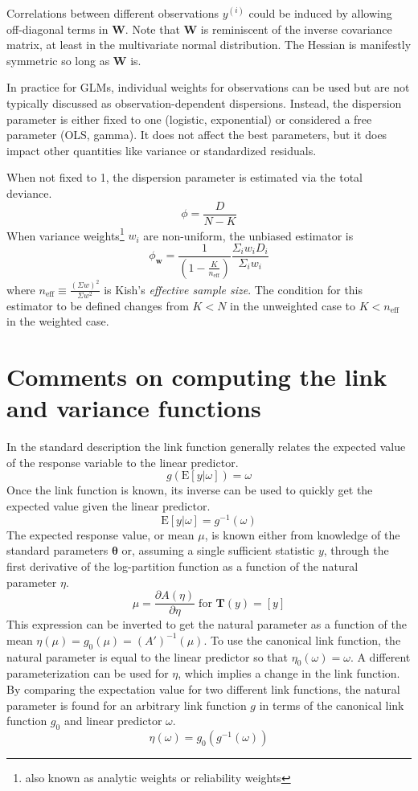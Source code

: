 \documentclass{article}
\begin{document}
Correlations between different observations \(y^{(i)}\) could be induced by
allowing off-diagonal terms in \(\mathbf{W}\). Note that \(\mathbf{W}\) is
reminiscent of the inverse covariance matrix, at least in the multivariate
normal distribution. The Hessian is manifestly symmetric so long as
\(\mathbf{W}\) is.

In practice for GLMs, individual weights for observations can be used but are
not typically discussed as observation-dependent dispersions. Instead, the
dispersion parameter is either fixed to one (logistic, exponential) or
considered a free parameter (OLS, gamma). It does not affect the best
parameters, but it does impact other quantities like variance or standardized
residuals.

When not fixed to 1, the dispersion parameter is estimated via the total deviance.
\[\phi = \frac{D}{N - K} \]
When variance weights\footnote{also known as analytic weights or reliability
weights} $w_i$ are non-uniform, the unbiased estimator is
\[\phi_{\mathbf{w}} = \frac{1}{\left(1 - \frac{K}{n_\mathrm{eff}}\right)} \frac{\Sigma_i w_i D_i}{\Sigma_i w_i} \]
where \(n_\mathrm{eff} \equiv \frac{\left(\Sigma w\right)^2}{\Sigma w^2} \) is Kish's
\emph{effective sample size}. The condition for this estimator to be defined
changes from \(K < N\) in the unweighted case to \(K < n_\mathrm{eff}\) in the
weighted case.

\section{Comments on computing the link and variance functions}

In the standard description the link function generally relates the expected
value of the response variable to the linear predictor.
\[ g(\textrm{E}[y|\omega]) = \omega \]
Once the link function is known, its inverse can be used to quickly get the
expected value given the linear predictor.
\[ \textrm{E}[y|\omega] = g^{-1}(\omega) \]
The expected response value, or mean \(\mu\), is known either from knowledge
of the standard parameters \(\boldsymbol{\theta}\) or, assuming a single
sufficient statistic \(y\), through the first derivative of the log-partition
function as a function of the natural parameter \(\eta\).
\[ \mu = \frac{\partial A(\eta)}{\partial \eta} \; \textrm{for } \mathbf{T}(y)
= [y]\]
This expression can be inverted to get the natural parameter as a function of the
mean \(\eta(\mu) = g_0(\mu) = (A')^{-1}(\mu)\).
To use the canonical link function, the natural parameter is equal to the linear
predictor so that \( \eta_0(\omega) = \omega \).
A different parameterization can be used for \(\eta\), which implies a change
in the link function.
By comparing the expectation value for
two different link functions, the natural parameter is found for an arbitrary link
function $g$ in terms of the canonical link function $g_0$ and linear predictor
$\omega$.
\[ \eta(\omega) = g_0 \left( g^{-1} (\omega) \right) \]
\end{document}
